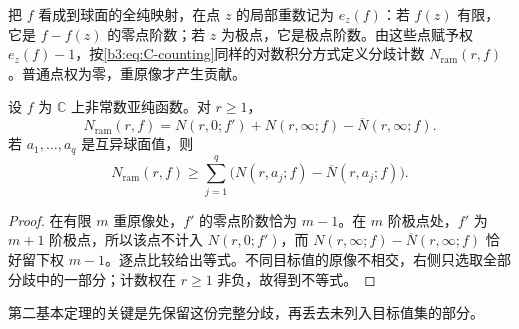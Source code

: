 把 \(f\) 看成到球面的全纯映射，在点 \(z\) 的局部重数记为 \(e_z(f)\)：若 \(f(z)\) 有限，它是 \(f-f(z)\) 的零点阶数；若 \(z\) 为极点，它是极点阶数。由这些点赋予权 \(e_z(f)-1\)，按\eqref{b3:eq:C-counting}同样的对数积分方式定义分歧计数 \(N_{\mathrm{ram}}(r,f)\)。普通点权为零，重原像才产生贡献。

\begin{proposition}[导数所记录的分歧]\label{b3:prop:C-ramification-count}
设 \(f\) 为 \(\mathbb C\) 上非常数亚纯函数。对 \(r\ge1\)，
\begin{equation}\label{b3:eq:C-ramification}
 N_{\mathrm{ram}}(r,f)
 =N(r,0;f')+N(r,\infty;f)-\overline N(r,\infty;f).
\end{equation}
若 \(a_1,\ldots,a_q\) 是互异球面值，则
\[
 N_{\mathrm{ram}}(r,f)\ge
 \sum_{j=1}^q\bigl(N(r,a_j;f)-\overline N(r,a_j;f)\bigr).
\]
\end{proposition}
\begin{proof}
在有限 \(m\) 重原像处，\(f'\) 的零点阶数恰为 \(m-1\)。在 \(m\) 阶极点处，\(f'\) 为 \(m+1\) 阶极点，所以该点不计入 \(N(r,0;f')\)，而 \(N(r,\infty;f)-\overline N(r,\infty;f)\) 恰好留下权 \(m-1\)。逐点比较给出等式。不同目标值的原像不相交，右侧只选取全部分歧中的一部分；计数权在 \(r\ge1\) 非负，故得到不等式。
\end{proof}

第二基本定理的关键是先保留这份完整分歧，再丢去未列入目标值集的部分。

